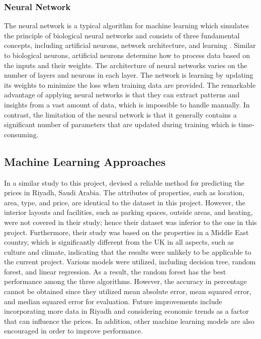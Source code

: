 \documentclass[12pt,twoside]{report}
\begin{document}
\subsubsection{Neural Network}
The neural network is a typical algorithm for machine learning which simulates the principle of biological neural networks and consists of three fundamental concepts, including artificial neurons, network architecture, and learning \citep{RN36}. Similar to biological neurons, artificial neurons determine how to process data based on the inputs and their weights. The architecture of neural networks varies on the number of layers and neurons in each layer. The network is learning by updating its weights to minimize the loss when training data are provided. The remarkable advantage of applying neural networks is that they can extract patterns and insights from a vast amount of data, which is impossible to handle manually. In contrast, the limitation of the neural network is that it generally contains a significant number of parameters that are updated during training which is time-consuming. 

\subsection{Machine Learning Approaches}
In a similar study to this project, \citet{RN17} devised a reliable method for predicting the prices in Riyadh, Saudi Arabia. The attributes of properties, such as location, area, type, and price, are identical to the dataset in this project. However, the interior layouts and facilities, such as parking spaces, outside areas, and heating, were not covered in their study; hence their dataset was inferior to the one in this project. Furthermore, their study was based on the properties in a Middle East country, which is significantly different from the UK in all aspects, such as culture and climate, indicating that the results were unlikely to be applicable to the current project. Various models were utilized, including decision tree, random forest, and linear regression. As a result, the random forest has the best performance among the three algorithms. However, the accuracy in percentage cannot be obtained since they utilized mean absolute error, mean squared error, and median squared error for evaluation. Future improvements include incorporating more data in Riyadh and considering economic trends as a factor that can influence the prices. In addition, other machine learning models are also encouraged in order to improve performance. 
\\
\end{document}
